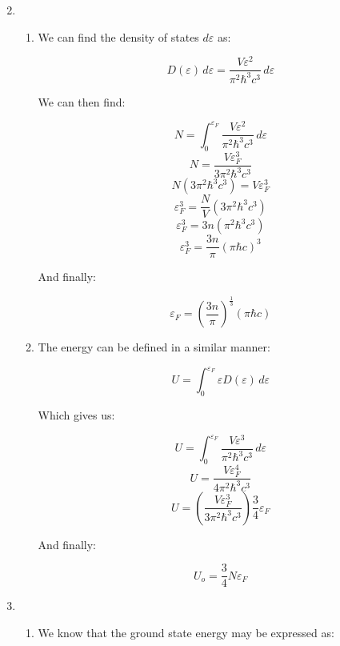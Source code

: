 \begin{enumerate}

    \setcounter{enumi}{1}

  \item

    \begin{enumerate}

      \item 

        We can find the density of states $d\varepsilon$ as:

        $$D(\varepsilon)\,d\varepsilon=\frac{V\varepsilon^2}{\pi^2\hbar^3c^3}\,d\varepsilon$$

        We can then find:

        $$N=\int_0^{\varepsilon_F}\frac{V\varepsilon^2}{\pi^2\hbar^3c^3}\,d\varepsilon$$
        $$N=\frac{V\varepsilon_F^3}{3\pi^2\hbar^3c^3}$$
        $$N(3\pi^2\hbar^3c^3)=V\varepsilon_F^3$$
        $$\varepsilon_F^3=\frac{N}{V}(3\pi^2\hbar^3c^3)$$
        $$\varepsilon_F^3=3n(\pi^2\hbar^3c^3)$$
        $$\varepsilon_F^3=\frac{3n}{\pi}(\pi\hbar c)^3$$

        And finally:

        $$\boxed{\varepsilon_F=\left(\frac{3n}{\pi}\right)^{\frac{1}{3}}(\pi\hbar c)}$$

      \item 

        The energy can be defined in a similar manner:

        $$U=\int_0^{\varepsilon_F}\varepsilon D(\varepsilon)\,d\varepsilon$$

        Which gives us:

        $$U=\int_0^{\varepsilon_F}\frac{V\varepsilon^3}{\pi^2\hbar^3c^3}\,d\varepsilon$$
        $$U=\frac{V\varepsilon_F^4}{4\pi^2\hbar^3c^3}$$
        $$U=\left(\frac{V\varepsilon_F^3}{3\pi^2\hbar^3c^3}\right)\frac{3}{4}\varepsilon_F$$

        And finally:

        $$\boxed{U_o=\frac{3}{4}N\varepsilon_F}$$

    \end{enumerate}

  \item

    \begin{enumerate}

      \item 

        We know that the ground state energy may be expressed as:


\end{enumerate}
\end{enumerate}
